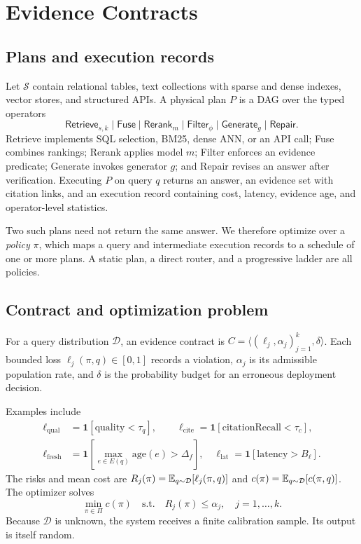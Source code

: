 \section{Evidence Contracts}
\label{sec:contracts}

\subsection{Plans and execution records}
\label{sec:algebra}

Let $\mathcal{S}$ contain relational tables, text collections with sparse
and dense indexes, vector stores, and structured APIs. A physical plan
$P$ is a DAG over the typed operators
\[
\textsf{Retrieve}_{s,k}\mid\textsf{Fuse}\mid\textsf{Rerank}_m\mid
\textsf{Filter}_\phi\mid\textsf{Generate}_g\mid\textsf{Repair}.
\]
\textsf{Retrieve} implements SQL selection, BM25, dense ANN, or an API
call; \textsf{Fuse} combines rankings; \textsf{Rerank} applies model $m$;
\textsf{Filter} enforces an evidence predicate; \textsf{Generate} invokes
generator $g$; and \textsf{Repair} revises an answer after verification.
Executing $P$ on query $q$ returns an answer, an evidence set with citation
links, and an execution record containing cost, latency, evidence age, and
operator-level statistics.

Two such plans need not return the same answer. We therefore optimize over
a \emph{policy} $\pi$, which maps a query and intermediate execution records
to a schedule of one or more plans. A static plan, a direct router, and a
progressive ladder are all policies.

\subsection{Contract and optimization problem}

\begin{definition}
\label{def:contract}
For a query distribution $\mathcal{D}$, an evidence contract is
$C=\langle(\ell_j,\alpha_j)_{j=1}^{k},\delta\rangle$. Each bounded loss
$\ell_j(\pi,q)\in[0,1]$ records a violation, $\alpha_j$ is its admissible
population rate, and $\delta$ is the probability budget for an erroneous
deployment decision.
\end{definition}

Examples include
\[
\begin{split}
\ell_{\mathrm{qual}}&=\mathbf{1}[\mathrm{quality}<\tau_q],\qquad
\ell_{\mathrm{cite}}=\mathbf{1}[\mathrm{citationRecall}<\tau_c],\\
\ell_{\mathrm{fresh}}&=\mathbf{1}[\max_{e\in E(q)}\mathrm{age}(e)>\Delta_f],
\quad
\ell_{\mathrm{lat}}=\mathbf{1}[\mathrm{latency}>B_\ell].
\end{split}
\]
The risks and mean cost are
$R_j(\pi)=\mathbb{E}_{q\sim\mathcal D}[\ell_j(\pi,q)]$ and
$c(\pi)=\mathbb{E}_{q\sim\mathcal D}[c(\pi,q)]$. The optimizer solves
\begin{equation}
\label{eq:problem}
\min_{\pi\in\Pi} c(\pi)
\quad\text{s.t.}\quad R_j(\pi)\leq\alpha_j,\quad j=1,\ldots,k .
\end{equation}
Because $\mathcal D$ is unknown, the system receives a finite calibration
sample. Its output is itself random.

